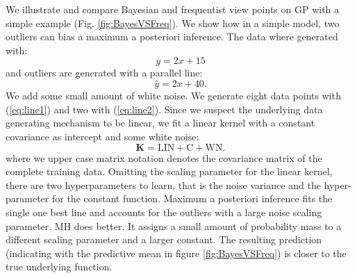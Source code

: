 We illustrate and compare Bayesian and frequentist view points on GP with a simple example (Fig. \ref{fig:BayesVSFreq}). We show how in a simple model, two outliers can bias a maximum a posteriori inference. The data where generated with:
\begin{equation}
\label{eq:line1}
y = 2x + 15
\end{equation}
and outliers are generated with a parallel line:
\begin{equation}
\label{eq:line2}
\hat{y} = 2x + 40.
\end{equation}
We add some small amount of white noise. We generate eight data points with (\ref{eq:line1}) and two with (\ref{eq:line2}). Since we suspect the underlying data generating mechanism to be linear, we fit a linear kernel with a constant covariance as intercept and some white noise:
\begin{equation}
\mathbf{K} = \text{LIN} + \text{C} + \text{WN}.
\end{equation}
where we upper case matrix notation denotes the covariance matrix of the complete training data. Omitting the scaling parameter for the linear kernel, there are two hyperparameters to learn, that is the noise variance and the hyper-parameter for the constant function. Maximum a posteriori inference fits the single one best line and accounts for the outliers with a large noise scaling parameter. MH does better. It assigns a small amount of probability mass to a different scaling parameter and a larger constant. The resulting prediction (indicating with the predictive mean in figure \ref{fig:BayesVSFreq}) is closer to the true underlying function.   


